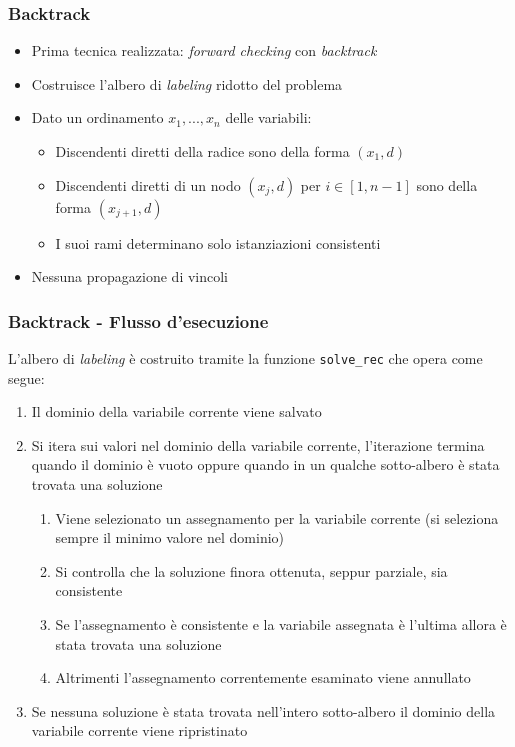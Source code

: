 \documentclass{beamer}
\begin{document}
\begin{frame}
\frametitle{Backtrack}

\begin{itemize}
	\item Prima tecnica realizzata: \textit{forward checking} con \textit{backtrack}
	\item Costruisce l'albero di \textit{labeling} ridotto del problema
	\item Dato un ordinamento $x_1, ..., x_n$ delle variabili:
		\begin{itemize}
			\item Discendenti diretti della radice sono della forma $(x_1, d)$
			\item Discendenti diretti di un nodo $(x_j, d)$ per $i \in \left [ 1, n-1 \right ]$ sono della forma $(x_{j+1}, d)$
			\item I suoi rami determinano solo istanziazioni consistenti
		\end{itemize}
	\item Nessuna propagazione di vincoli
\end{itemize}

\end{frame}

\begin{frame}[fragile]
\frametitle{Backtrack - Flusso d'esecuzione}
L'albero di \textit{labeling} è costruito tramite la funzione \texttt{solve\_rec} che opera come segue:
\begin{enumerate}
\item Il dominio della variabile corrente viene salvato
\item Si itera sui valori nel dominio della variabile corrente, l'iterazione termina quando il dominio è vuoto oppure quando in un qualche sotto-albero è stata trovata una soluzione
	\begin{enumerate}
		\item Viene selezionato un assegnamento per la variabile corrente (si seleziona sempre il minimo valore nel dominio)
		\item Si controlla che la soluzione finora ottenuta, seppur parziale, sia consistente
		\item Se l'assegnamento è consistente e la variabile assegnata è l'ultima allora è stata trovata una soluzione
		\item Altrimenti l'assegnamento correntemente esaminato viene annullato
	\end{enumerate}
\item Se nessuna soluzione è stata trovata nell'intero sotto-albero il dominio della variabile corrente viene ripristinato
\end{enumerate}
\end{frame}
\end{document}
